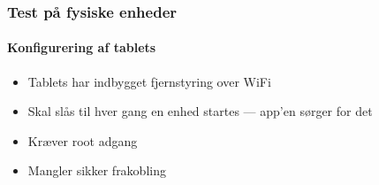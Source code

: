 \begin{frame}
    \frametitle{Test på fysiske enheder}
    \framesubtitle{Konfigurering af tablets}
    \begin{itemize}
        \item Tablets har indbygget fjernstyring over WiFi
        \item Skal slås til hver gang en enhed startes --- app'en sørger for det
        \item Kræver root adgang
        \item Mangler sikker frakobling
    \end{itemize}
\end{frame}

